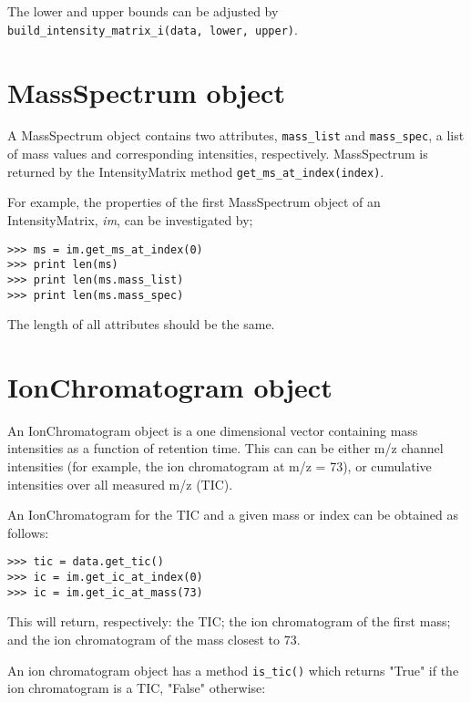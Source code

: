 The lower and upper bounds can be adjusted by {\tt
build\_intensity\_matrix\_i(data, lower, upper)}.

\section{MassSpectrum object}


\noindent
A MassSpectrum object contains two attributes, {\tt mass\_list} and
{\tt mass\_spec}, a list of mass values and corresponding intensities,
respectively. MassSpectrum is returned by the IntensityMatrix method
{\tt get\_ms\_at\_index(index)}.

For example, the properties of the first MassSpectrum object of an
IntensityMatrix, {\em im}, can be investigated by;

\begin{verbatim}
>>> ms = im.get_ms_at_index(0)
>>> print len(ms)
>>> print len(ms.mass_list)
>>> print len(ms.mass_spec)
\end{verbatim}

\noindent
The length of all attributes should be the same.

\section{IonChromatogram object}
\label{sec:ion-chromatogram-object}

\noindent
An IonChromatogram object is a one dimensional vector containing
mass intensities as a function of retention time. This can can be either
m/z channel intensities (for example, the ion chromatogram at m/z = 73),
or cumulative intensities over all measured m/z (TIC).

An IonChromatogram for the TIC and a given mass or index can be obtained
as follows:

\begin{verbatim}
>>> tic = data.get_tic()
>>> ic = im.get_ic_at_index(0)
>>> ic = im.get_ic_at_mass(73)
\end{verbatim}

\noindent
This will return, respectively: the TIC; the ion chromatogram of the first
mass; and the ion chromatogram of the mass closest to 73.

An ion chromatogram object has a method {\tt is\_tic()} which returns "True"
if the ion chromatogram is a TIC, "False" otherwise:

